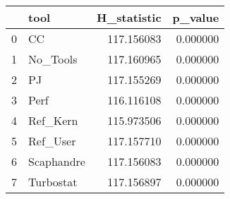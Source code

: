 \begin{tabular}{llrr}
\toprule
 & tool & H_statistic & p_value \\
\midrule
0 & CC & 117.156083 & 0.000000 \\
1 & No_Tools & 117.160965 & 0.000000 \\
2 & PJ & 117.155269 & 0.000000 \\
3 & Perf & 116.116108 & 0.000000 \\
4 & Ref_Kern & 115.973506 & 0.000000 \\
5 & Ref_User & 117.157710 & 0.000000 \\
6 & Scaphandre & 117.156083 & 0.000000 \\
7 & Turbostat & 117.156897 & 0.000000 \\
\bottomrule
\end{tabular}
